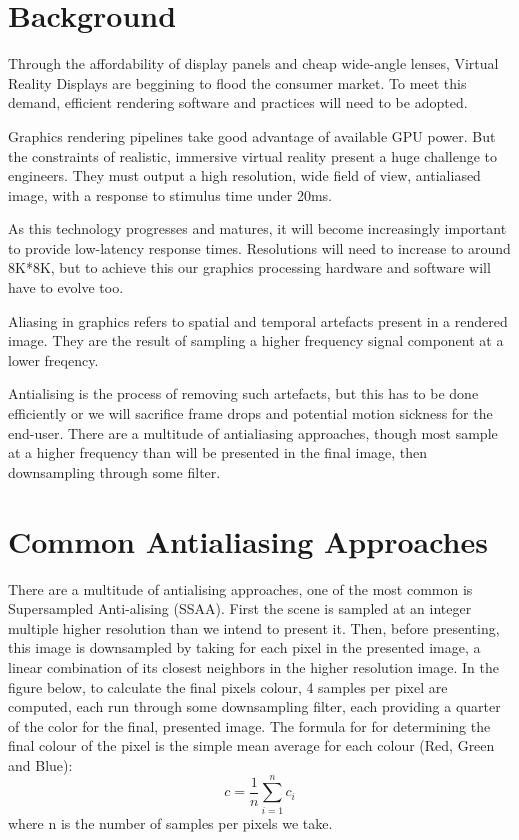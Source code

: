 \documentclass[12pt,a4paper,twoside,openright]{report}
\begin{document}
\section{Background}

Through the affordability of display panels and cheap wide-angle lenses, Virtual Reality Displays are beggining to flood the consumer market. To meet this demand, efficient rendering software and practices will need to be adopted.

Graphics rendering pipelines take good advantage of available GPU power. But the constraints of realistic, immersive virtual reality present a huge challenge to engineers. They must output a high resolution, wide field of view, antialiased image, with a response to stimulus time under 20ms.

As this technology progresses and matures, it will become increasingly important to provide low-latency response times. Resolutions will need to increase to around 8K*8K, but to achieve this our graphics processing hardware and software will have to evolve too.

Aliasing in graphics refers to spatial and temporal artefacts present in a rendered image. They are the result of sampling a higher frequency signal component at a lower freqency.

Antialising is the process of removing such artefacts, but this has to be done efficiently or we will sacrifice frame drops and potential motion sickness for the end-user.
There are a multitude of antialiasing approaches, though most sample at a higher frequency than will be presented in the final image, then downsampling through some filter. 

\section{Common Antialiasing Approaches}

There are a multitude of antialising approaches, one of the most common is Supersampled Anti-alising (SSAA).
First the scene is sampled at an integer multiple higher resolution than we intend to present it.
Then, before presenting, this image is downsampled by taking for each pixel in the presented image, a linear combination of its closest neighbors in the higher resolution image. In the figure below, to calculate the final pixels colour, 4 samples per pixel are computed, each run through some downsampling filter, each providing a quarter of the color for the final, presented image. The formula for for determining the final colour of the pixel is the simple mean average for each colour (Red, Green and Blue):
$$ c = \frac{1}{n}\displaystyle\sum_{i=1}^n c_i $$ where n is the number of samples per pixels we take.
\end{document}

